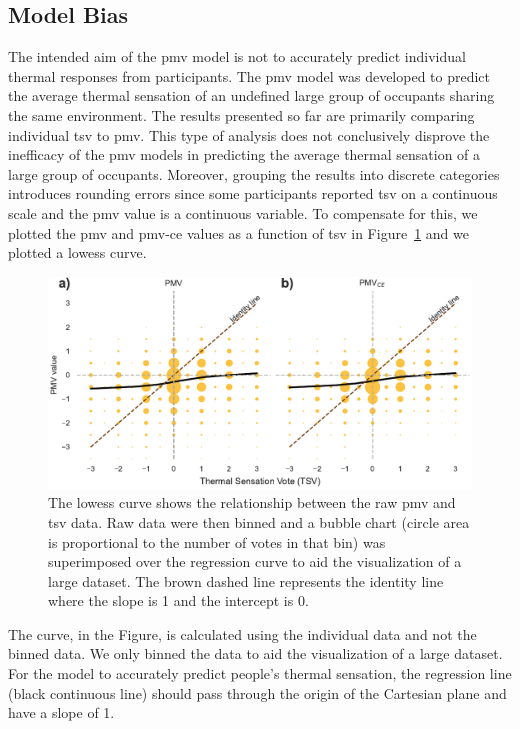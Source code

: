 \subsection{Model Bias}\label{subsec:model-bias}
The intended aim of the \ac{pmv} model is not to accurately predict individual thermal responses from participants.
The \ac{pmv} model was developed to predict the average thermal sensation of an undefined large group of occupants sharing the same environment.
The results presented so far are primarily comparing individual \ac{tsv} to \ac{pmv}.
This type of analysis does not conclusively disprove the inefficacy of the \ac{pmv} models in predicting the average thermal sensation of a large group of occupants.
Moreover, grouping the results into discrete categories introduces rounding errors since some participants reported \ac{tsv} on a continuous scale and the \ac{pmv} value is a continuous variable.
To compensate for this, we plotted the \ac{pmv} and \ac{pmv-ce} values as a function of \ac{tsv} in Figure~\ref{fig:bubble_models_vs_tsv} and we plotted a \ac{lowess} curve.
\begin{figure}[htb!]
    \centering
    \includegraphics[width=\textwidth]{figures/bubble_models_vs_tsv}
    \caption{The \ac{lowess} curve shows the relationship between the raw \ac{pmv} and \ac{tsv} data.
    Raw data were then binned and a bubble chart (circle area is proportional to the number of votes in that bin) was superimposed over the regression curve to aid the visualization of a large dataset.
    The brown dashed line represents the identity line where the slope is 1 and the intercept is 0.}
    \label{fig:bubble_models_vs_tsv}
\end{figure}
The curve, in the Figure, is calculated using the individual data and not the binned data.
We only binned the data to aid the visualization of a large dataset.
For the model to accurately predict people’s thermal sensation, the regression line (black continuous line) should pass through the origin of the Cartesian plane and have a slope of 1.
